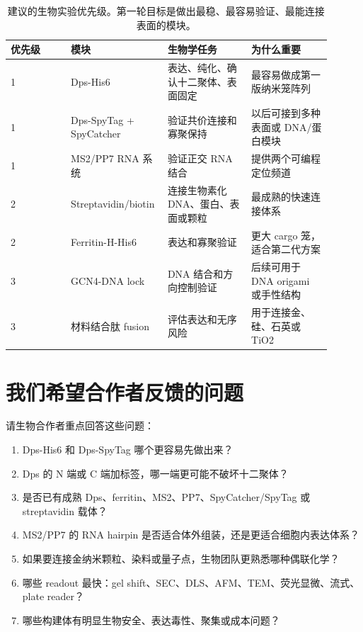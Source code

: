 \documentclass[11pt]{article}
\begin{document}
\begin{table}[H]
\centering
\small
\begin{tabular}{p{0.18\linewidth}p{0.23\linewidth}p{0.25\linewidth}p{0.24\linewidth}}
\toprule
优先级 & 模块 & 生物学任务 & 为什么重要 \\
\midrule
1 & Dps-His6 & 表达、纯化、确认十二聚体、表面固定 & 最容易做成第一版纳米笼阵列 \\
1 & Dps-SpyTag + SpyCatcher & 验证共价连接和寡聚保持 & 以后可接到多种表面或 DNA/蛋白模块 \\
1 & MS2/PP7 RNA 系统 & 验证正交 RNA 结合 & 提供两个可编程定位频道 \\
2 & Streptavidin/biotin & 连接生物素化 DNA、蛋白、表面或颗粒 & 最成熟的快速连接体系 \\
2 & Ferritin-H-His6 & 表达和寡聚验证 & 更大 cargo 笼，适合第二代方案 \\
3 & GCN4-DNA lock & DNA 结合和方向控制验证 & 后续可用于 DNA origami 或手性结构 \\
3 & 材料结合肽 fusion & 评估表达和无序风险 & 用于连接金、硅、石英或 TiO2 \\
\bottomrule
\end{tabular}
\caption{建议的生物实验优先级。第一轮目标是做出最稳、最容易验证、最能连接表面的模块。}
\label{tab:priority}
\end{table}

\section{我们希望合作者反馈的问题}

请生物合作者重点回答这些问题：

\begin{enumerate}
\item Dps-His6 和 Dps-SpyTag 哪个更容易先做出来？
\item Dps 的 N 端或 C 端加标签，哪一端更可能不破坏十二聚体？
\item 是否已有成熟 Dps、ferritin、MS2、PP7、SpyCatcher/SpyTag 或 streptavidin 载体？
\item MS2/PP7 的 RNA hairpin 是否适合体外组装，还是更适合细胞内表达体系？
\item 如果要连接金纳米颗粒、染料或量子点，生物团队更熟悉哪种偶联化学？
\item 哪些 readout 最快：gel shift、SEC、DLS、AFM、TEM、荧光显微、流式、plate reader？
\item 哪些构建体有明显生物安全、表达毒性、聚集或成本问题？
\end{enumerate}
\end{document}
